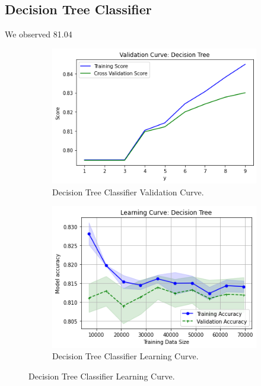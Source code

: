 \clearpage

\subsection{Decision Tree Classifier}
We observed 81.04%
\begin{figure}[h]
\centering
\begin{subfigure}[b]{0.45\linewidth}
    \includegraphics[width=\linewidth]{dtcvc}
    \caption{Decision Tree Classifier Validation Curve.}
\end{subfigure}
\begin{subfigure}[b]{0.45\linewidth}
    \includegraphics[width=\linewidth]{dtclc}
    \caption{Decision Tree Classifier Learning Curve.}
\end{subfigure}
\end{figure}


